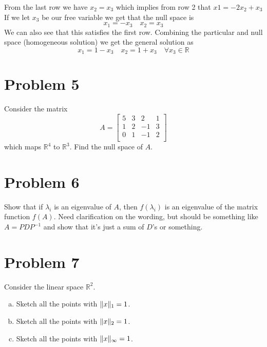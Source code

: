 \documentclass{article}
\DeclarePairedDelimiter\norm{\lVert}{\rVert}%
\begin{document}
From the last row we have
$ x_2 = x_3 $
which implies from row 2 that
$ x1 = -2x_2 + x_3 $
If we let $x_3$ be our free variable we get that the null space is
$$ x_1 = -x_3 \quad x_2 = x_3 $$
We can also see that this satisfies the first row.
Combining the particular and null space (homogeneous solution) we get the general solution as
$$ x_1 = 1-x_3 \quad x_2 = 1 + x_3 \quad \forall x_3 \in \mathbb{R} $$

\section*{Problem 5}
Consider the matrix
$$
A=
\begin{bmatrix}
5 & 3 & 2 & 1 \\
1 & 2 & -1 & 3 \\
0 & 1 & -1 & 2 \\
\end{bmatrix}
$$
which maps $\mathbb{R}^4$ to $\mathbb{R}^3$. Find the null space of $A$.
\newline
\newline

\section*{Problem 6}
Show that if $\lambda_i$ is an eigenvalue of $A$, then $f(\lambda_i)$ is an eigenvalue of the matrix function $f(A)$.
\newline
\newline
Need clarification on the wording, but should be something like $A = PDP^{-1}$ and show that it's just a sum of $D$'s or something.

\section*{Problem 7}
Consider the linear space $\mathbb{R}^2$.
\begin{enumerate}[(a)]
\item Sketch all the points with $\norm{x}_1 = 1$.
\newline
\newline

\item Sketch all the points with $\norm{x}_2 = 1$.
\newline
\newline

\item Sketch all the points with $\norm{x}_\infty = 1$.
\newline
\newline

\end{enumerate}
\end{document}
